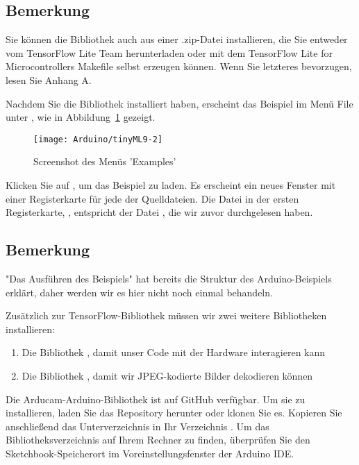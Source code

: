 \subsection{Bemerkung}

Sie können die Bibliothek auch aus einer .zip-Datei installieren, die Sie entweder vom TensorFlow Lite Team herunterladen oder mit dem TensorFlow Lite for Microcontrollers Makefile selbst erzeugen können. Wenn Sie letzteres bevorzugen, lesen Sie Anhang A.

Nachdem Sie die Bibliothek installiert haben, erscheint das Beispiel  im Menü File unter , wie in Abbildung~\ref{tinyML9-2} gezeigt.

\begin{figure}
  \texttt{[image: Arduino/tinyML9-2]}
  \caption{Screenshot des Menüs 'Examples'}\label{tinyML9-2}
\end{figure}



Klicken Sie auf , um das Beispiel zu laden. Es erscheint ein neues Fenster mit einer Registerkarte für jede der Quelldateien. Die Datei in der ersten Registerkarte, , entspricht der Datei , die wir zuvor durchgelesen haben.

\subsection{Bemerkung}

"Das Ausführen des Beispiels" hat bereits die Struktur des Arduino-Beispiels erklärt, daher werden wir es hier nicht noch einmal behandeln.

Zusätzlich zur TensorFlow-Bibliothek müssen wir zwei weitere Bibliotheken installieren:

\begin{enumerate}
  \item Die Bibliothek , damit unser Code mit der Hardware interagieren kann
  \item Die Bibliothek , damit wir JPEG-kodierte Bilder dekodieren können
\end{enumerate}

Die Arducam-Arduino-Bibliothek ist auf GitHub verfügbar. Um sie zu installieren, laden Sie das Repository herunter oder klonen Sie es. Kopieren Sie anschließend das Unterverzeichnis  in Ihr Verzeichnis . Um das Bibliotheksverzeichnis auf Ihrem Rechner zu finden, überprüfen Sie den Sketchbook-Speicherort im Voreinstellungsfenster der Arduino IDE.

